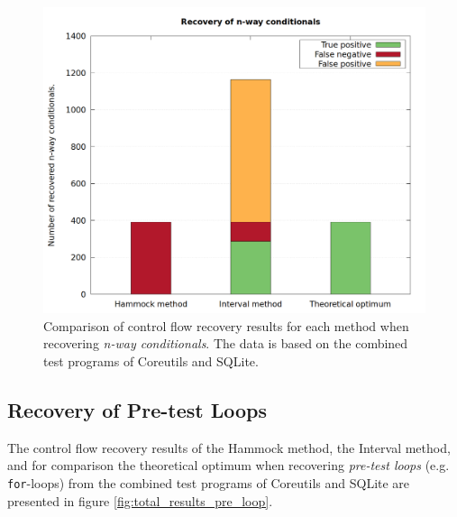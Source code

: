 \begin{figure}[htbp]
	\centering
	\includegraphics[width=\textwidth]{inc/5_results/results_n-way.png}
	\caption{Comparison of control flow recovery results for each method when recovering \textit{n-way conditionals}. The data is based on the combined test programs of Coreutils and SQLite.}
	\label{fig:total_results_nway}
\end{figure}

\clearpage

\subsection{Recovery of Pre-test Loops}
\label{sec:recovery_of_pre-test_loops}

The control flow recovery results of the Hammock method, the Interval method, and for comparison the theoretical optimum when recovering \textit{pre-test loops} (e.g. \texttt{for}-loops) from the combined test programs of Coreutils and SQLite are presented in figure \ref{fig:total_results_pre_loop}.

